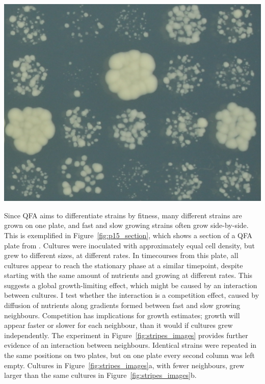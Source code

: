 \begin{Figure}
  \centering
  \includegraphics[width=\linewidth]{p15_section/p15_section_4x5_5_18}
  \label{fig:p15_section}
\end{Figure}

Since QFA aims to differentiate strains by fitness, many different
strains are grown on one plate, and fast and slow growing strains
often grow side-by-side. This is exemplified in
Figure~\ref{fig:p15_section}, which shows a section of a QFA plate
from \citet{Addinall2011}. Cultures were inoculated with approximately
equal cell density, but grew to different sizes, at different
rates. In timecourses from this plate, all cultures appear to reach
the stationary phase at a similar timepoint, despite starting with the
same amount of nutrients and growing at different rates. This suggests
a global growth-limiting effect, which might be caused by an
interaction between cultures. I test whether the interaction is a
competition effect, caused by diffusion of nutrients along gradients
formed between fast and slow growing neighbours. Competition has
implications for growth estimates; growth will appear faster or slower
for each neighbour, than it would if cultures grew independently. The
experiment in Figure~\ref{fig:stripes_images} provides further
evidence of an interaction between neighbours. Identical strains were
repeated in the same positions on two plates, but on one plate every
second column was left empty. Cultures in
Figure~\ref{fig:stripes_images}a, with fewer neighbours, grew larger
than the same cultures in Figure~\ref{fig:stripes_images}b.


